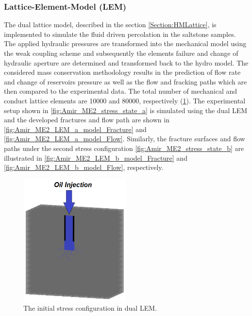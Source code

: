 \subsubsection*{Lattice-Element-Model (LEM)}

The dual lattice model, described in the section \ref{Section:HMLattice}, is implemented to simulate the fluid driven percolation in the saltstone samples. The applied hydraulic pressures are transformed into the mechanical model using the weak coupling scheme and subsequently the elements failure and change of hydraulic aperture are determined and transformed back to the hydro model. The considered mass conservation methodology results in the prediction of flow rate and change of reservoirs pressure as well as the flow and fracking paths which are then compared to the experimental data. The total number of mechanical and conduct lattice elements are 10000 and 80000, respectively (\ref{fig:Amir_ME2_LEM_a_model}).  The experimental setup shown in \ref{fig:Amir_ME2_stress_state_a} is simulated using  the dual LEM and the developed fractures and flow path are shown in \ref{fig:Amir_ME2_LEM_a_model_Fracture} and \ref{fig:Amir_ME2_LEM_a_model_Flow}. Similarly, the fracture surfaces and flow paths under the second stress configuration \ref{fig:Amir_ME2_stress_state_b} are illustrated in \ref{fig:Amir_ME2_LEM_b_model_Fracture} and \ref{fig:Amir_ME2_LEM_b_model_Flow}, respectively. 

\begin{figure}[!ht]
\centering
\includegraphics[width=0.5\textwidth]{figures/Amir_ME2_LEM_a_model.png}
\caption{The initial stress configuration in dual LEM.}
\label{fig:Amir_ME2_LEM_a_model}
\end{figure}

